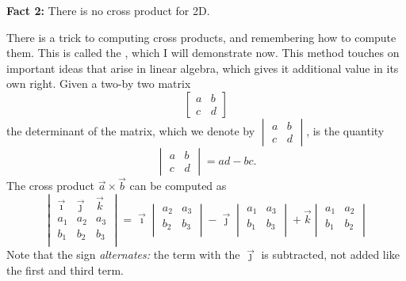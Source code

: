 \documentclass[10pt]{article}
\theoremstyle{definition}
\newcommand{\fl}{\noindent\textbf} %
\newcommand{\1}[1]{\textbf{1}_{\left[#1\right]}} %
\newcommand{\dempfcolor}[1]{{\color{RoyalBlue}#1}}
\newcommand{\demph}[1]{\dempfcolor{{\sl #1}}}
\begin{document}
\fl{Fact 2:} There is no cross product for 2D.

There is a trick to computing cross products, and remembering how to compute
them. This is called the \demph{method of cofactor expansion}, which I will
demonstrate now. This method touches on important ideas that arise in linear
algebra, which gives it additional value in its own right. Given a two-by two matrix
\begin{equation*}
  \begin{bmatrix}
    a&b\\
    c&d
  \end{bmatrix}
\end{equation*}
the determinant of the matrix, which we denote by  $\begin{vmatrix} a&b\\c&d \end{vmatrix}$, is the quantity
\begin{equation*}
  \begin{vmatrix}
    a&b\\
    c&d
  \end{vmatrix}
  = ad-bc.
\end{equation*}
The cross product $\vec{a}\times \vec{b}$ can be computed as
\begin{equation*}
  \begin{vmatrix}
    \vec{\imath}&\vec{\jmath}&\vec{k}\\
    a_{1}&a_{2}&a_{3}\\
    b_{1}&b_{2}&b_{3}\\
  \end{vmatrix}
  =
  \vec{\imath}
  \begin{vmatrix}
    a_{2}&a_{3}\\
    b_{2}&b_{3}\\
  \end{vmatrix}
  -
  \vec{\jmath}
  \begin{vmatrix}
    a_{1}&a_{3}\\
    b_{1}&b_{3}\\
  \end{vmatrix}
  +
  \vec{k}
  \begin{vmatrix}
    a_{1}&a_{2}\\
    b_{1}&b_{2}\\
  \end{vmatrix}
\end{equation*}
Note that the sign \textit{alternates:} the term with the $\vec{\jmath}$ is subtracted, not
added like the first and third term.
\end{document}
